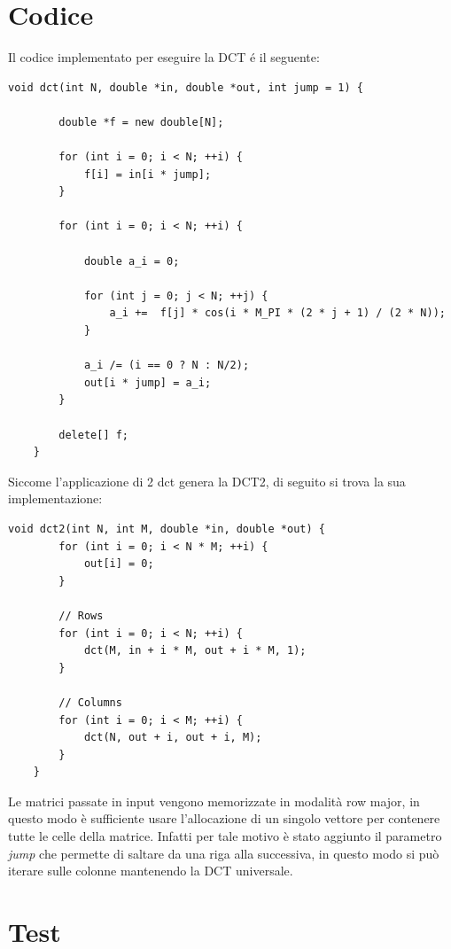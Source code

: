 \section{Codice}

Il codice implementato per eseguire la DCT é il seguente:


\begin{lstlisting}[gobble=1]
	void dct(int N, double *in, double *out, int jump = 1) {
		
		double *f = new double[N];
		
		for (int i = 0; i < N; ++i) {
			f[i] = in[i * jump];
		}
		
		for (int i = 0; i < N; ++i) {
			
			double a_i = 0;
			
			for (int j = 0; j < N; ++j) {
				a_i +=  f[j] * cos(i * M_PI * (2 * j + 1) / (2 * N));
			}
			
			a_i /= (i == 0 ? N : N/2);
			out[i * jump] = a_i;
		}
		
		delete[] f;
	}
\end{lstlisting}

Siccome l'applicazione di 2 dct genera la DCT2, di seguito si trova la sua implementazione:

\begin{lstlisting}[gobble=1]
	void dct2(int N, int M, double *in, double *out) {
		for (int i = 0; i < N * M; ++i) {
			out[i] = 0;
		}
		
		// Rows
		for (int i = 0; i < N; ++i) {
			dct(M, in + i * M, out + i * M, 1);
		}
		
		// Columns
		for (int i = 0; i < M; ++i) {
			dct(N, out + i, out + i, M);
		}
	}
\end{lstlisting}

Le matrici passate in input vengono memorizzate in modalità row major, in questo modo è sufficiente usare l'allocazione di un singolo vettore per contenere tutte le celle della matrice. Infatti per tale motivo è stato aggiunto il parametro \textit{jump} che permette di saltare da una riga alla successiva, in questo modo si può iterare sulle colonne mantenendo la DCT universale.



\section{Test}

